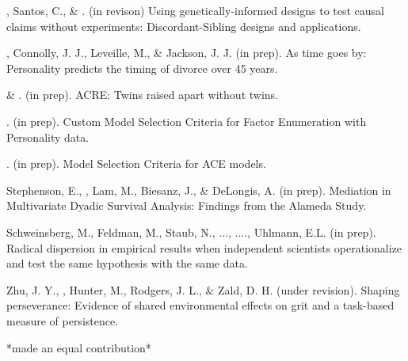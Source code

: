 
\item \meb, Santos, C., \& \joe. (in revison) Using genetically-informed designs to test causal claims without experiments: Discordant-Sibling designs and applications. \href{https://osf.io/zpdwt/}{\color{blue}{https://osf.io/zpdwt/}}%

\item\meb, Connolly, J. J., Leveille, M., \& Jackson, J. J. (in prep). As time goes by: Personality predicts the timing of divorce over 45 years.%
\item \meb \& \joe.  (in prep). ACRE: Twins raised apart without twins.
\item \meb. (in prep). Custom Model Selection Criteria for Factor Enumeration with Personality data.
\item \meb. (in prep). Model Selection Criteria for ACE models.
\item Stephenson, E., \meb, Lam, M., Biesanz, J., \& DeLongis, A. (in prep). Mediation in Multivariate Dyadic Survival Analysis: Findings from the Alameda Study. %
\item Schweinsberg, M., Feldman, M., Staub, N., ..., \meb ...., Uhlmann, E.L. (in prep). Radical dispersion in empirical results when independent scientists operationalize and test the same hypothesis with the same data. 
\item Zhu, J. Y., \meb, Hunter, M., Rodgers, J. L., \& Zald, D. H. (under revision). Shaping perseverance: Evidence of shared environmental effects on grit and a task-based measure of persistence. %
\vspace{-2mm}\begin{center}\footnotesize{*made an equal contribution*}\end{center} \vspace{-3mm}
\vspace{-2mm}\begin{center}\end{center} \vspace{-4mm}
